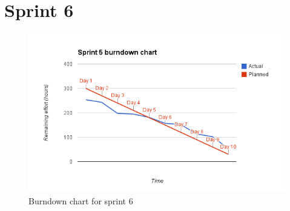 \section{Sprint 6}
\begin{figure}[H]
\includegraphics[width=\textwidth]{appendix/backlog/burndown5.png}
\caption{Burndown chart for sprint 6}
\end{figure}


